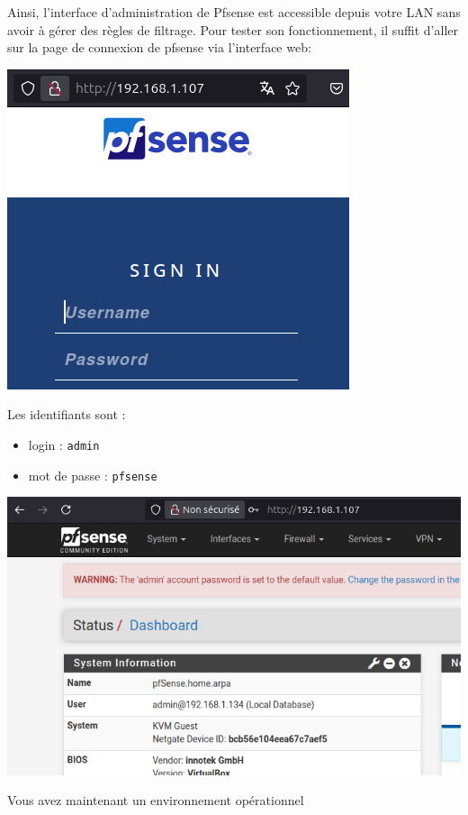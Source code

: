 \documentclass[french, 12pt]{article}%
\newcommand{\itemE}{\item[$\bullet$]}
\begin{document}
Ainsi, l'interface d'administration de Pfsense est accessible depuis votre LAN sans avoir à gérer des règles de filtrage. Pour tester son fonctionnement, il suffit d'aller sur la page de connexion de pfsense via l'interface web: 


\begin{center}
\includegraphics[scale=0.7]{./ressource/pfsenseLog}
\end{center}

Les identifiants sont  : 
\begin{itemize}
\itemE login : \verb?admin?
\itemE mot de passe : \verb?pfsense?
\end{itemize}


\begin{center}
\includegraphics[scale=0.7]{./ressource/pfsenseIndex}
\end{center}

Vous avez maintenant un environnement opérationnel 
\end{document}
